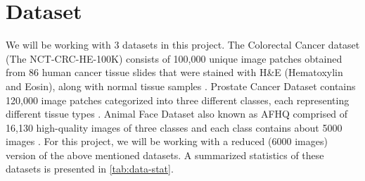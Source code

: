 \documentclass[10pt,twocolumn,letterpaper]{article}
\begin{document}




\section{Dataset}

We will be working with 3 datasets in this project. The Colorectal Cancer dataset (The NCT-CRC-HE-100K) consists of 100,000 unique image patches obtained from 86 human cancer tissue slides that were stained with H\&E (Hematoxylin and Eosin), along with normal tissue samples \cite{kather_2018_1214456}. Prostate Cancer Dataset contains 120,000 image patches categorized into three different classes, each representing different tissue types \cite{tolkach_2021_4789576}. Animal Face Dataset also known as AFHQ comprised of 16,130 high-quality images of three classes and each class contains about 5000 images \cite{Larxel_2020}. For this project, we will be working with a reduced (6000 images) version of the above mentioned datasets. A summarized statistics of these datasets is presented in \autoref{tab:data-stat}.
\end{document}
